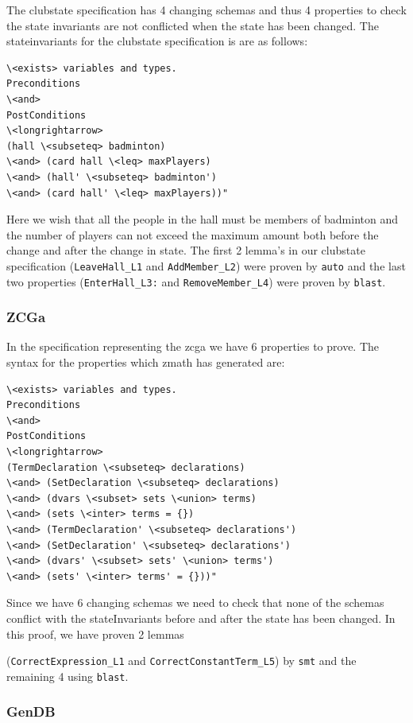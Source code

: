 The clubstate specification \cite{mathlangexamples} has 4 changing schemas and thus 4 properties to
check the state invariants are not conflicted when the state has been changed.
The stateinvariants for the clubstate specification is are as follows:

\begin{verbatim}
\<exists> variables and types.
Preconditions
\<and>
PostConditions
\<longrightarrow>
(hall \<subseteq> badminton) 
\<and> (card hall \<leq> maxPlayers)
\<and> (hall' \<subseteq> badminton') 
\<and> (card hall' \<leq> maxPlayers))"
\end{verbatim}

Here we wish that all the people in the hall must be members of badminton and
the number of players can not exceed the maximum amount both before the change
and after the change in state. The first 2 lemma's in our clubstate
specification (\verb|LeaveHall_L1| and \verb|AddMember_L2|) were proven by
\verb|auto| and the last two properties (\verb|EnterHall_L3:| and
\verb|RemoveMember_L4|) were proven by \verb|blast|.

\subsubsection{ZCGa}

In the specification \cite{mathlangexamples} representing the \gls{zcga} we have 6 properties to prove.
The syntax for the properties which \gls{zmath} has generated are:

\begin{verbatim}
\<exists> variables and types.
Preconditions
\<and>
PostConditions
\<longrightarrow>
(TermDeclaration \<subseteq> declarations)
\<and> (SetDeclaration \<subseteq> declarations)
\<and> (dvars \<subset> sets \<union> terms)
\<and> (sets \<inter> terms = {})
\<and> (TermDeclaration' \<subseteq> declarations')
\<and> (SetDeclaration' \<subseteq> declarations')
\<and> (dvars' \<subset> sets' \<union> terms')
\<and> (sets' \<inter> terms' = {}))"
\end{verbatim}

Since we have 6 changing schemas we need to check that none of the schemas
conflict with the stateInvariants before and after the state has been changed.
In this proof, we have proven 2 lemmas

(\verb|CorrectExpression_L1| and \verb|CorrectConstantTerm_L5|) by \verb|smt|
and the remaining 4 using \verb|blast|.

\subsubsection{GenDB}

